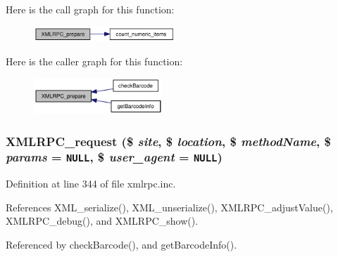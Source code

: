 Here is the call graph for this function:\nopagebreak
\begin{figure}[H]
\begin{center}
\leavevmode
\includegraphics[width=151pt]{xmlrpc_8inc_c13be54b26e0803d8745e4f019dcfd8a_cgraph}
\end{center}
\end{figure}


Here is the caller graph for this function:\nopagebreak
\begin{figure}[H]
\begin{center}
\leavevmode
\includegraphics[width=137pt]{xmlrpc_8inc_c13be54b26e0803d8745e4f019dcfd8a_icgraph}
\end{center}
\end{figure}
\hypertarget{xmlrpc_8inc_3a98b6984b8ca01752d1aa9a267526a3}{
\subsubsection{\setlength{\rightskip}{0pt plus 5cm}XMLRPC\_\-request (\$ {\em site}, \$ {\em location}, \$ {\em methodName}, \$ {\em params} = {\tt NULL}, \$ {\em user\_\-agent} = {\tt NULL})}}
\label{xmlrpc_8inc_3a98b6984b8ca01752d1aa9a267526a3}




Definition at line 344 of file xmlrpc.inc.

References XML\_\-serialize(), XML\_\-unserialize(), XMLRPC\_\-adjustValue(), XMLRPC\_\-debug(), and XMLRPC\_\-show().

Referenced by checkBarcode(), and getBarcodeInfo().

